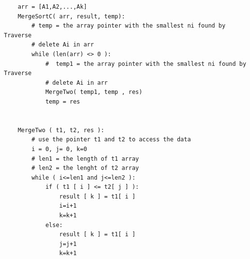 \documentclass[12pt,a4paper]{article}
\begin{document}
	\begin{lstlisting}
	arr = [A1,A2,...,Ak]
	MergeSortC( arr, result, temp):
		# temp = the array pointer with the smallest ni found by Traverse
		# delete Ai in arr
		while (len(arr) <> 0 ):
			#  temp1 = the array pointer with the smallest ni found by Traverse
			# delete Ai in arr
			MergeTwo( temp1, temp , res)
			temp = res
			

	MergeTwo ( t1, t2, res ):
		# use the pointer t1 and t2 to access the data
		i = 0, j= 0, k=0
		# len1 = the length of t1 array
		# len2 = the lenght of t2 array
		while ( i<=len1 and j<=len2 ):
			if ( t1 [ i ] <= t2[ j ] ):
				result [ k ] = t1[ i ]
				i=i+1
				k=k+1
			else:
				result [ k ] = t1[ i ]
				j=j+1
				k=k+1
	\end{lstlisting}
\end{document}
